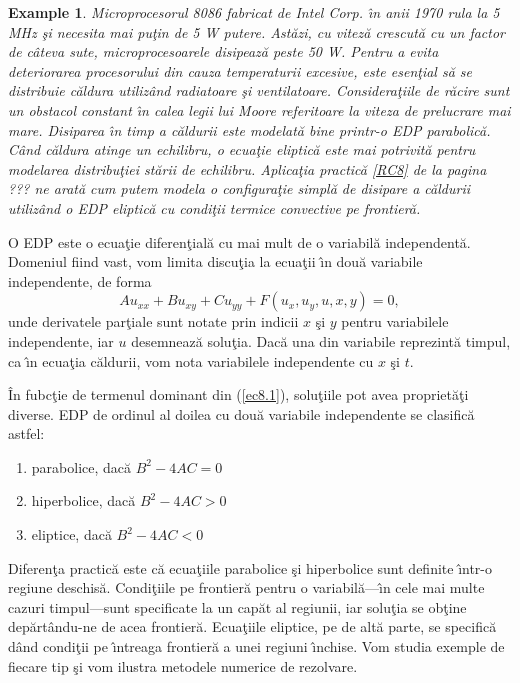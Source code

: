 \documentclass{book}%
\newtheorem{example}[theorem]{Example}
\begin{document}
\begin{example}
Microprocesorul 8086 fabricat de Intel Corp. \^{\i}n anii 1970 rula la 5 MHz
\c{s}i necesita mai pu\c{t}in de 5 W putere. Ast\u{a}zi, cu vitez\u{a}
crescut\u{a} cu un factor de c\^{a}teva sute, microprocesoarele disipeaz\u{a}
peste 50 W. Pentru a evita deteriorarea procesorului din cauza temperaturii
excesive, este esen\c{t}ial s\u{a} se distribuie c\u{a}ldura utiliz\^{a}nd
radiatoare \c{s}i ventilatoare. Considera\c{t}iile de r\u{a}cire sunt un
obstacol constant \^{\i}n calea legii lui Moore referitoare la viteza de
prelucrare mai mare. Disiparea \^{\i}n timp a c\u{a}ldurii este modelat\u{a}
bine printr-o EDP parabolic\u{a}. C\^{a}nd c\u{a}ldura atinge un echilibru, o
ecua\c{t}ie eliptic\u{a} este mai potrivit\u{a} pentru modelarea
distribu\c{t}iei st\u{a}rii de echilibru. Aplica\c{t}ia practic\u{a} \ref{RC8}
de la pagina ??? ne arat\u{a} cum putem modela o configura\c{t}ie simpl\u{a}
de disipare a c\u{a}ldurii utiliz\^{a}nd o EDP eliptic\u{a} cu condi\c{t}ii
termice convective pe frontier\u{a}.
\end{example}

O EDP este o ecua\c{t}ie diferen\c{t}ial\u{a} cu mai mult de o variabil\u{a}
independent\u{a}. Domeniul fiind vast, vom limita discu\c{t}ia la ecua\c{t}ii
\^{\i}n dou\u{a} variabile independente, de forma
\begin{equation}
Au_{xx}+Bu_{xy}+Cu_{yy}+F(u_{x},u_{y},u,x,y)=0, \label{ec8.1}%
\end{equation}
unde derivatele par\c{t}iale sunt notate prin indicii $x$ \c{s}i $y$ pentru
variabilele independente, iar $u$ desemneaz\u{a} solu\c{t}ia. Dac\u{a} una din
variabile reprezint\u{a} timpul, ca \^{\i}n ecua\c{t}ia c\u{a}ldurii, vom nota
variabilele independente cu $x$ \c{s}i $t$.

\^{I}n fubc\c{t}ie de termenul dominant din (\ref{ec8.1}), solu\c{t}iile pot
avea propriet\u{a}\c{t}i diverse. EDP de ordinul al doilea cu dou\u{a}
variabile independente se clasific\u{a} astfel:

\begin{enumerate}
\item parabolice, dac\u{a} $B^{2}-4AC=0$

\item hiperbolice, dac\u{a} $B^{2}-4AC>0$

\item eliptice, dac\u{a} $B^{2}-4AC<0$
\end{enumerate}

Diferen\c{t}a practic\u{a} este c\u{a} ecua\c{t}iile parabolice \c{s}i
hiperbolice sunt definite \^{\i}ntr-o regiune deschis\u{a}. Condi\c{t}iile pe
frontier\u{a} pentru o variabil\u{a}---\^{\i}n cele mai multe cazuri
timpul---sunt specificate la un cap\u{a}t al regiunii, iar solu\c{t}ia se
ob\c{t}ine dep\u{a}rt\^{a}ndu-ne de acea frontier\u{a}. Ecua\c{t}iile
eliptice, pe de alt\u{a} parte, se specific\u{a} d\^{a}nd condi\c{t}ii pe
\^{\i}ntreaga frontier\u{a} a unei regiuni \^{\i}nchise. Vom studia exemple de
fiecare tip \c{s}i vom ilustra metodele numerice de rezolvare.
\end{document}
